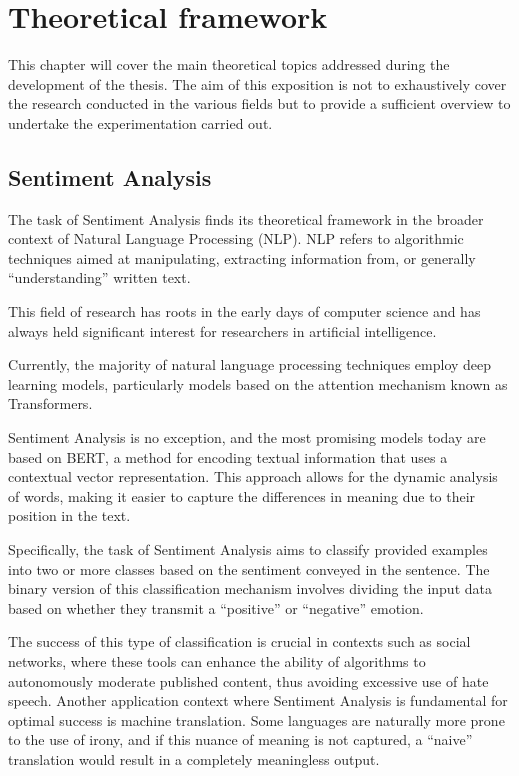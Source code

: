\chapter{Theoretical framework}

This chapter will cover the main theoretical topics addressed during the development of the thesis. 
The aim of this exposition is not to exhaustively cover the research conducted in the various fields 
but to provide a sufficient overview to undertake the experimentation carried out.

\section{Sentiment Analysis}\label{sec:bsa}

The task of Sentiment Analysis\cite{SentAnalysis} finds its theoretical framework in the broader context of Natural Language Processing (NLP). 
NLP refers to algorithmic techniques aimed at manipulating, extracting information from, or generally ``understanding'' written text.

This field of research has roots in the early days of computer science and has always held significant interest for researchers in artificial intelligence.

Currently, the majority of natural language processing techniques employ deep learning models, 
particularly models based on the attention mechanism known as Transformers\cite{Attention}.

Sentiment Analysis is no exception, and the most promising models today are based on BERT\cite{BERT}, 
a method for encoding textual information that uses a contextual vector representation. 
This approach allows for the dynamic analysis of words, making it easier to capture the differences in meaning due to their position in the text.

Specifically, the task of Sentiment Analysis aims to classify provided examples into two or more classes based on the sentiment conveyed in the sentence. 
The binary version of this classification mechanism involves dividing the input data based on whether they transmit a ``positive'' or ``negative'' emotion.

The success of this type of classification is crucial in contexts such as social networks\cite{SentTweeter}, 
where these tools can enhance the ability of algorithms to autonomously moderate published content, 
thus avoiding excessive use of hate speech. 
Another application context where Sentiment Analysis is fundamental for optimal success is machine translation. 
Some languages are naturally more prone to the use of irony, 
and if this nuance of meaning is not captured, a ``naive'' translation would result in a completely meaningless output.

